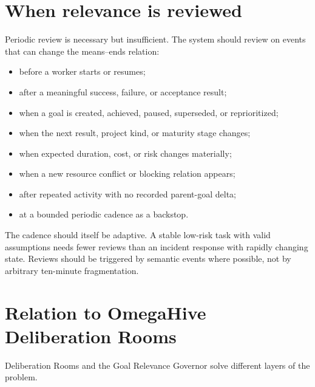 \documentclass[11pt,letterpaper]{article}
\begin{document}
\section{When relevance is reviewed}

Periodic review is necessary but insufficient. The system should review on
events that can change the means--ends relation:

\begin{itemize}
  \item before a worker starts or resumes;
  \item after a meaningful success, failure, or acceptance result;
  \item when a goal is created, achieved, paused, superseded, or reprioritized;
  \item when the next result, project kind, or maturity stage changes;
  \item when expected duration, cost, or risk changes materially;
  \item when a new resource conflict or blocking relation appears;
  \item after repeated activity with no recorded parent-goal delta;
  \item at a bounded periodic cadence as a backstop.
\end{itemize}

The cadence should itself be adaptive. A stable low-risk task with valid
assumptions needs fewer reviews than an incident response with rapidly changing
state. Reviews should be triggered by semantic events where possible, not by
arbitrary ten-minute fragmentation.

\section{Relation to OmegaHive Deliberation Rooms}

Deliberation Rooms and the Goal Relevance Governor solve different layers of
the problem.
\end{document}
